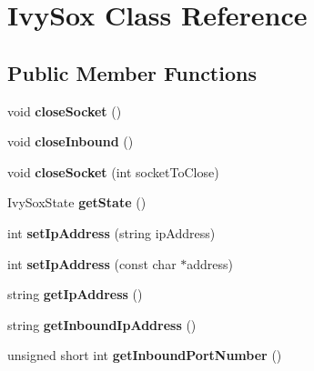 \hypertarget{class_ivy_sox}{}\section{Ivy\+Sox Class Reference}
\label{class_ivy_sox}
\subsection*{Public Member Functions}
\begin{DoxyCompactItemize}
\item 
\hypertarget{class_ivy_sox_a0163ec7295912de86eed220d94475bf6}{}void {\bfseries close\+Socket} ()\label{class_ivy_sox_a0163ec7295912de86eed220d94475bf6}

\item 
\hypertarget{class_ivy_sox_ab0be0c4bc597a4d548316867e26c27e5}{}void {\bfseries close\+Inbound} ()\label{class_ivy_sox_ab0be0c4bc597a4d548316867e26c27e5}

\item 
\hypertarget{class_ivy_sox_a5386037f948f1090e584b33a821f71f6}{}void {\bfseries close\+Socket} (int socket\+To\+Close)\label{class_ivy_sox_a5386037f948f1090e584b33a821f71f6}

\item 
\hypertarget{class_ivy_sox_a172ab20ae241912f22e30eaf3fcf89bd}{}Ivy\+Sox\+State {\bfseries get\+State} ()\label{class_ivy_sox_a172ab20ae241912f22e30eaf3fcf89bd}

\item 
\hypertarget{class_ivy_sox_a68f70b61eacdfc82af809738a0ddad32}{}int {\bfseries set\+Ip\+Address} (string ip\+Address)\label{class_ivy_sox_a68f70b61eacdfc82af809738a0ddad32}

\item 
\hypertarget{class_ivy_sox_a92692a133fa3d26b4882e66cb874d2d7}{}int {\bfseries set\+Ip\+Address} (const char $\ast$address)\label{class_ivy_sox_a92692a133fa3d26b4882e66cb874d2d7}

\item 
\hypertarget{class_ivy_sox_a21a767ad2cd771d3558945d218945cb5}{}string {\bfseries get\+Ip\+Address} ()\label{class_ivy_sox_a21a767ad2cd771d3558945d218945cb5}

\item 
\hypertarget{class_ivy_sox_ae3c8d855d2ea2446d6e0751e22431909}{}string {\bfseries get\+Inbound\+Ip\+Address} ()\label{class_ivy_sox_ae3c8d855d2ea2446d6e0751e22431909}

\item 
\hypertarget{class_ivy_sox_ac8cb7a98dfb8788d33609cc06d1c7bd4}{}unsigned short int {\bfseries get\+Inbound\+Port\+Number} ()\label{class_ivy_sox_ac8cb7a98dfb8788d33609cc06d1c7bd4}


\end{DoxyCompactItemize}
